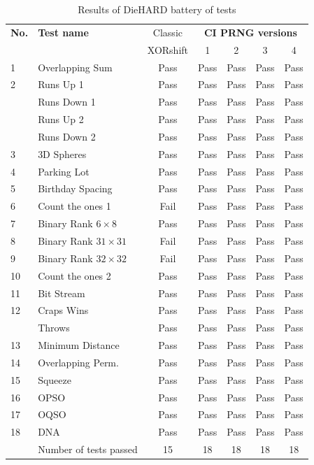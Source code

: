 \begin{tiny}
\begin{table}[!t]
\renewcommand{\arraystretch}{1.3}
\caption{Results of DieHARD battery of tests }
\label{Results of DieHARD battery of tests}
\centering
\begin{tabular}{llccccc} \toprule
\textbf{No.} &\textbf{Test name} &Classic &\multicolumn{4}{c}{\textbf{CI PRNG versions}} \\ \cmidrule(r){3-7}
& & XORshift &1 & 2 & 3 & 4\\ \midrule
1 & Overlapping Sum &Pass &Pass &Pass&Pass &Pass\\
2 & Runs Up 1 &Pass & Pass &Pass&Pass &Pass\\
&Runs Down 1 &Pass &Pass &Pass&Pass &Pass\\
&Runs Up 2 & Pass &Pass &Pass&Pass &Pass\\
&Runs Down 2 &Pass & Pass &Pass&Pass &Pass\\
3 & 3D Spheres &Pass &Pass &Pass&Pass &Pass\\
4 & Parking Lot &Pass &Pass &Pass&Pass &Pass\\
5 & Birthday Spacing &Pass &Pass &Pass&Pass &Pass\\
6 & Count the ones 1 &Fail &Pass &Pass&Pass &Pass\\
7 &Binary Rank $6 \times 8$ &Pass & Pass &Pass&Pass &Pass\\
8 &Binary Rank $31 \times 31$ &Fail &Pass &Pass&Pass &Pass\\
9 &Binary Rank $32 \times 32$ &Fail &Pass &Pass&Pass &Pass\\
10 &Count the ones 2 &Pass &Pass&Pass&Pass &Pass \\
11 &Bit Stream &Pass &Pass&Pass &Pass &Pass\\
12 &Craps Wins &Pass &Pass&Pass &Pass &Pass \\
&Throws &Pass &Pass &Pass&Pass &Pass\\
13 &Minimum Distance &Pass &Pass &Pass&Pass &Pass\\
14 &Overlapping Perm. &Pass &Pass &Pass&Pass &Pass\\
15 &Squeeze &Pass &Pass&Pass &Pass &Pass\\
16 &OPSO &Pass &Pass&Pass &Pass &Pass\\
17 &OQSO &Pass &Pass&Pass &Pass &Pass\\
18 &DNA &Pass &Pass&Pass &Pass &Pass\\
&Number of tests passed &15 &18 &18&18&18\\\bottomrule
\end{tabular}
\end{table}
\end{tiny}

